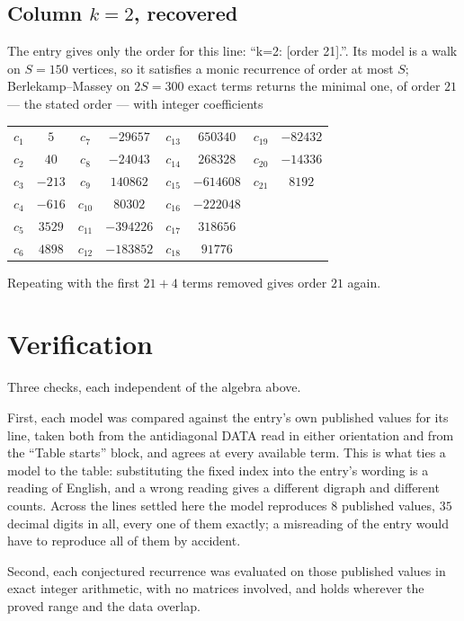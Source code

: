 \documentclass[11pt,a4paper]{article}
\theoremstyle{plain}
\theoremstyle{definition}
\begin{document}
\subsection*{Column $k=2$, recovered}
The entry gives only the order for this line: ``k=2: [order 21].''. Its model is a walk on
$S=150$ vertices, so it satisfies a monic recurrence of order at most $S$;
Berlekamp--Massey on $2S=300$ exact terms returns the minimal one, of order
$21$ --- the stated order --- with integer coefficients
\begin{center}\small\begin{tabular}{cccccccc}
$c_{1}$ & $5$ & $c_{7}$ & $-29657$ & $c_{13}$ & $650340$ & $c_{19}$ & $-82432$ \\
$c_{2}$ & $40$ & $c_{8}$ & $-24043$ & $c_{14}$ & $268328$ & $c_{20}$ & $-14336$ \\
$c_{3}$ & $-213$ & $c_{9}$ & $140862$ & $c_{15}$ & $-614608$ & $c_{21}$ & $8192$ \\
$c_{4}$ & $-616$ & $c_{10}$ & $80302$ & $c_{16}$ & $-222048$ &  &  \\
$c_{5}$ & $3529$ & $c_{11}$ & $-394226$ & $c_{17}$ & $318656$ &  &  \\
$c_{6}$ & $4898$ & $c_{12}$ & $-183852$ & $c_{18}$ & $91776$ &  &  \\
\end{tabular}\end{center}
Repeating with the first $21+4$ terms removed gives order $21$ again.

\section{Verification}

Three checks, each independent of the algebra above.

First, each model was compared against the entry's own published values for its line, taken
both from the antidiagonal DATA read in either orientation and from the ``Table starts''
block, and agrees at every available term. This is what ties a model to the table:
substituting the fixed index into the entry's wording is a reading of English, and a wrong
reading gives a different digraph and different counts. Across the lines settled here the
model reproduces $8$ published values, $35$ decimal digits in all, every one of
them exactly; a misreading of the entry would have to reproduce all of them by accident.

Second, each conjectured recurrence was evaluated on those published values in exact
integer arithmetic, with no matrices involved, and holds wherever the proved range and the
data overlap.
\end{document}
